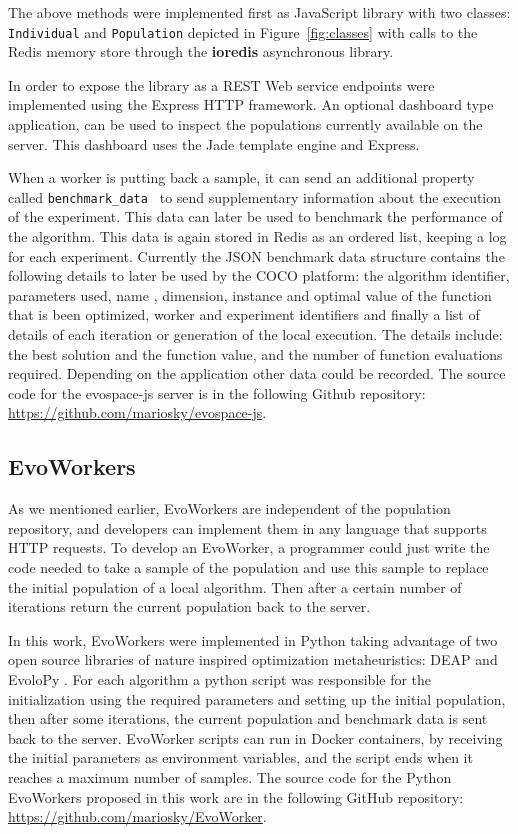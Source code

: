 The above methods were implemented first as JavaScript library 
with two classes: {\tt Individual} and {\tt Population} depicted 
in Figure~\ref{fig:classes} with calls to the Redis memory store \cite{}
through the {\bf ioredis} asynchronous library. 

In order to expose the library as a 
REST Web service endpoints were implemented using the Express HTTP framework.
An optional dashboard type application, can be used to inspect 
the populations currently available on the server. This dashboard uses
the Jade template engine and Express.

When a worker is putting back a sample, it can send 
an additional property called {\tt benchmark\_data }
to send supplementary information about the execution 
of the experiment.  This data can later be used to 
benchmark the performance of the algorithm. This 
data is again stored in Redis as an ordered list, 
keeping a log for each experiment. Currently the JSON 
benchmark data structure contains the following details 
to later be used by the COCO platform: the algorithm identifier, 
parameters used, name , dimension, instance and optimal value 
of the function that is been optimized, worker and experiment 
identifiers and finally a list of details of each iteration 
or generation of the local execution. The details include:
the best solution and the function value, and the number of
function evaluations required. Depending on the application
other data could be recorded. The source code for the {\sf evospace-js}
server is in the following Github repository: 
\url{https://github.com/mariosky/evospace-js}.


\subsection{EvoWorkers}
\label{sec:evoworkers}
As we mentioned earlier, EvoWorkers are independent of 
the population repository, and developers can implement them 
in any language that supports HTTP requests. To develop an 
EvoWorker, a programmer could just write the code needed to 
take a sample of the population and use this sample to 
replace the initial population of a local algorithm. 
Then after a certain number of iterations return the 
current population back to the server.

In this work, EvoWorkers were implemented in Python 
taking advantage of two open source libraries of nature inspired optimization 
metaheuristics:  DEAP \cite{fortin2012deap} and EvoloPy 
\cite{faris2016evolopy}. For each algorithm a 
python script was responsible for the initialization using 
the required parameters and setting up the initial population, 
then after some iterations, the current population and 
benchmark data is sent back to the server. EvoWorker 
scripts can run in Docker containers, by receiving 
the initial parameters as environment variables, and 
the script ends when it reaches a maximum number of samples.
The source code for the Python EvoWorkers
proposed in this work are in the following GitHub repository: 
\url{https://github.com/mariosky/EvoWorker}.

